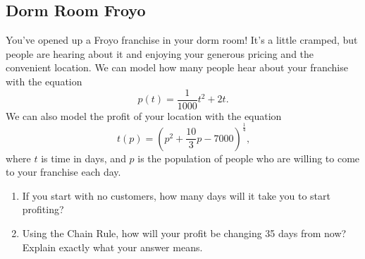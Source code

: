 \documentclass{ximera}
\begin{document}
\subsection{Dorm Room Froyo}
You've opened up a Froyo franchise in your dorm room! It's a little cramped, but people are hearing about it and enjoying your generous pricing and the convenient location. We can model how many people hear about your franchise with the equation $$p(t) = \frac{1}{1000}t^2 + 2t \text{.}$$ We can also model the profit of your location with the equation $$t(p) = (p^2 + \frac{10}{3}p - 7000)^{\frac{1}{4}} \text{,}$$ where $t$ is time in days, and $p$ is the population of people who are willing to come to your franchise each day.

\begin{enumerate}
\item{If you start with no customers, how many days will it take you to start profiting?}
\item{Using the Chain Rule, how will your profit be changing 35 days from now? Explain exactly what your answer means.}
\end{enumerate}
\pagebreak
\end{document}
